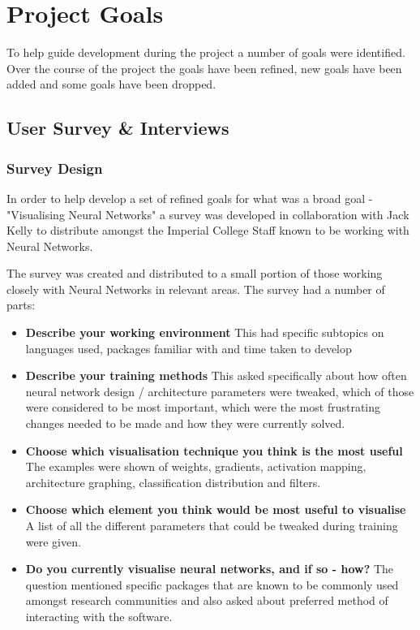 \documentclass[a4paper,11pt,titlepage]{article}
\begin{document}
\section{Project Goals}
	To help guide development during the project a number of goals were identified. Over the course of the project the goals have been refined, new goals have been added and some goals have been dropped.
	\subsection{User Survey \& Interviews}
	\subsubsection{Survey Design}
	\par
	In order to help develop a set of refined goals for what was a broad goal - "Visualising Neural Networks"	 a survey was developed in collaboration with Jack Kelly to distribute amongst the Imperial College Staff known to be working with Neural Networks.
	\par 
	The survey was created and distributed to a small portion of those working closely with Neural Networks in relevant areas. The survey had a number of parts:
	\begin{itemize}
	
		\item \textbf{Describe your working environment}
		This had specific subtopics on languages used, packages familiar with and time taken to develop
		\item \textbf{Describe your training methods}
		This asked specifically about how often neural network design / architecture parameters were tweaked, which of those were considered to be most important, which were the most frustrating changes needed to be made and how they were currently solved.
		\item \textbf{Choose which visualisation technique you think is the most useful}
		The examples were shown of weights, gradients, activation mapping, architecture graphing, classification distribution and filters. 
		\item \textbf{Choose which element you think would be most useful to visualise}
		A list of all the different parameters that could be tweaked during training were given.
		\item \textbf{Do you currently visualise neural networks, and if so - how?}
		The question mentioned specific packages that are known to be commonly used amongst research communities and also asked about preferred method of interacting with the software. 
	
	\end{itemize}
	
\end{document}
